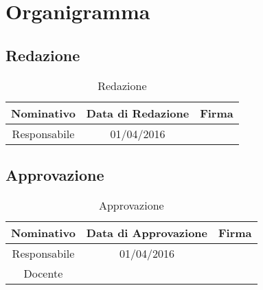 \section{Organigramma}

\subsection{Redazione}
\begin{table}[h]
\centering
\bgroup
\def\arraystretch{3}
\begin{tabular}{| c | c | p{5cm} |}
\hline
\textbf{Nominativo} & \textbf{Data di Redazione} & \textbf{Firma}\\ \hline 
\hline
Responsabile & 01/04/2016 & 
\\ \hline  
\end{tabular}
\egroup
\caption{Redazione}
\end{table}

\subsection{Approvazione}
\begin{table}[h]
\centering
\bgroup
\def\arraystretch{3}
\begin{tabular}{| c | c | p{5cm} |}
\hline
\textbf{Nominativo} & \textbf{Data di Approvazione} & \textbf{Firma}\\ \hline \hline
Responsabile & 01/04/2016 & 
\\ \hline  
Docente &  & \\ \hline
\end{tabular}
\egroup
\caption{Approvazione}
\end{table}

\newpage

